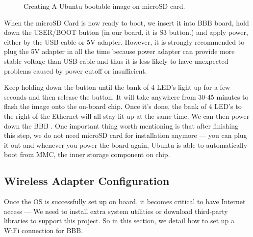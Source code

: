 \documentclass[12pt,journal,draftclsnofoot,onecolumn]{IEEEtran}
\begin{document}
\begin{figure}[htb]
	\centering
     \caption{Creating A Ubuntu bootable image on microSD card.}
     \end{figure}

When the microSD Card is now ready to boot, we insert it into BBB board, hold down the USER/BOOT button (in our board, it is S3 button.) and apply power, either by the USB cable or 5V adapter. However, it is strongly recommended to plug the 5V adapter in all the time because power adapter can provide more stable voltage than USB cable and thus it is less likely to have unexpected problems caused by power cutoff or insufficient.

Keep holding down the button until  the bank of 4 LED's light up for a few seconds and then release the button.
It will take anywhere from 30-45 minutes to flash the image onto the on-board chip. Once it's done, the bank of 4 LED's to the right of the Ethernet will all stay lit up at the same time. We can then power down the BBB \cite{flashBB}. One important thing worth mentioning is that after finishing this step, we do not need microSD card for installation anymore --- you can plug it out and whenever you power the board again, Ubuntu is able to automatically boot from MMC, the inner storage component on chip.
	
\subsection{Wireless Adapter Configuration}\label{Wireless}
Once the OS is successfully set up on board, it becomes critical to have Internet access --- We need to install extra system utilities or download third-party libraries to support this project. So in this section, we detail how to set up a WiFi connection for BBB.
\end{document}
